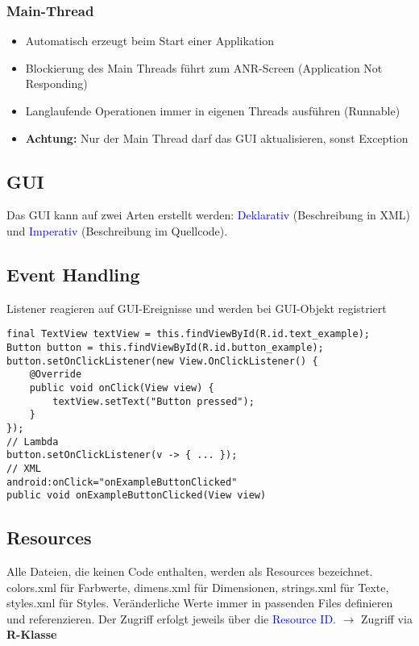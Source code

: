 \subsubsection{Main-Thread}
\begin{itemize}[topsep=0pt, leftmargin=4mm]
    \setlength\itemsep{-0.3em}
    \item Automatisch erzeugt beim Start einer Applikation
    \item Blockierung des Main Threads führt zum ANR-Screen (Application Not Responding)
    \item Langlaufende Operationen immer in eigenen Threads ausführen (Runnable)
    \item \textbf{Achtung:} Nur der Main Thread darf das GUI aktualisieren, sonst Exception
\end{itemize}
\subsection{GUI}
Das GUI kann auf zwei Arten erstellt werden: \textcolor{blue}{Deklarativ} (Beschreibung in XML) und \textcolor{blue}{Imperativ} (Beschreibung im Quellcode).
\subsection{Event Handling}
Listener reagieren auf GUI-Ereignisse und werden bei GUI-Objekt registriert
\begin{lstlisting}
final TextView textView = this.findViewById(R.id.text_example);
Button button = this.findViewById(R.id.button_example);
button.setOnClickListener(new View.OnClickListener() {
    @Override
    public void onClick(View view) {
        textView.setText("Button pressed");
    }
});
// Lambda
button.setOnClickListener(v -> { ... });
// XML
android:onClick="onExampleButtonClicked"
public void onExampleButtonClicked(View view)
\end{lstlisting}
\subsection{Resources}
Alle Dateien, die keinen Code enthalten, werden als Resources bezeichnet. colors.xml für Farbwerte, dimens.xml für Dimensionen, strings.xml für Texte, styles.xml für Styles. Veränderliche Werte
immer in passenden Files definieren und referenzieren. Der Zugriff erfolgt jeweils über die \textcolor{blue}{Resource ID}. $\rightarrow$ Zugriff via \textbf{R-Klasse}
